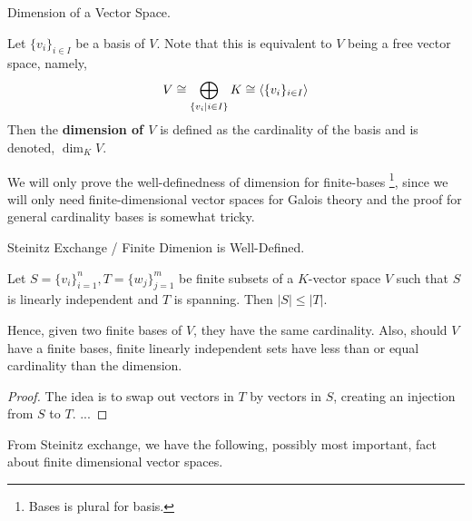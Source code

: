 \documentclass[../../book.tex]{subfiles}
\begin{document}
\begin{dfn} Dimension of a Vector Space.

    Let $\{v_i\}_{i\in I}$ be a basis of $V$. 
    Note that this is equivalent to $V$ being a free vector space, namely, 
    \[
        V \cong \bigoplus_{\{v_i \mid i\in I\}} K \cong \langle\{v_i\}_{i\in I}\rangle 
    \]
    Then the \textbf{dimension of $V$} is defined as the cardinality of the basis
    and is denoted, $\dim_K V$. 
    
    We will only prove the well-definedness of dimension for finite-bases
    \footnote{Bases is plural for basis.}, 
    since we will only need finite-dimensional vector spaces for Galois theory
    and the proof for general cardinality bases is somewhat tricky. 
\end{dfn}
\begin{lem} Steinitz Exchange / Finite Dimenion is Well-Defined. 

    Let $S = \{v_i\}_{i=1}^n, T = \{w_j\}_{j=1}^m$ be finite subsets 
    of a $K$-vector space $V$ such that 
    $S$ is linearly independent and $T$ is spanning. 
    Then $|S| \leq |T|$.
    
    Hence, given two finite bases of $V$, they have the same cardinality. 
    Also, should $V$ have a finite bases,
    finite linearly independent sets have less than or equal cardinality
    than the dimension.
\end{lem}
\begin{proof}
    The idea is to swap out vectors in $T$ by vectors in $S$, 
    creating an injection from $S$ to $T$. 
    ...
\end{proof}
From Steinitz exchange, we have the following, possibly most important, fact about 
finite dimensional vector spaces.
\end{document}
